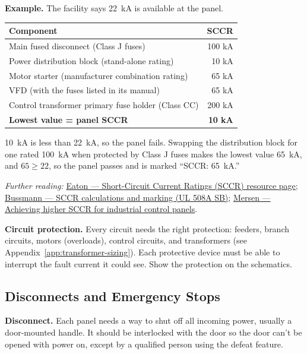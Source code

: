 \textbf{Example.} The facility says 22~kA is available at the panel.
\begin{center}
\small
\begin{tabular}{@{}lr@{}}
\toprule
Component & SCCR \\ \midrule
Main fused disconnect (Class J fuses) & 100 kA \\
Power distribution block (stand-alone rating) & 10 kA \\
Motor starter (manufacturer combination rating) & 65 kA \\
VFD (with the fuses listed in its manual) & 65 kA \\
Control transformer primary fuse holder (Class CC) & 200 kA \\ \midrule
\textbf{Lowest value = panel SCCR} & \textbf{10 kA} \\
\bottomrule
\end{tabular}
\end{center}
10~kA is less than 22~kA, so the panel fails. Swapping the distribution block for one rated 100~kA when protected by Class J fuses makes the lowest value 65~kA, and $65 \geq 22$, so the panel passes and is marked ``SCCR: 65~kA.''

\textit{Further reading:} \href{https://www.eaton.com/us/en-us/products/electrical-circuit-protection/short-circuit-current-ratings.html}{Eaton --- Short-Circuit Current Ratings (SCCR) resource page}; \href{https://www.eaton.com/content/dam/eaton/products/electrical-circuit-protection/fuses/solution-center/bus-ele-tech-lib-short-circuit-current-rating-calculations-and-marking-2008-spd.pdf}{Bussmann --- SCCR calculations and marking (UL 508A SB)}; \href{https://www.mersen.com/sites/default/files/files_imported_ep/TT-SCN1-Achieving-Higher-Short-Circuit-Current-Ratings-for-Industrial-Control-Panels-Tech-Topic.pdf}{Mersen --- Achieving higher SCCR for industrial control panels}.

\textbf{Circuit protection.} Every circuit needs the right protection: feeders, branch circuits, motors (overloads), control circuits, and transformers (see Appendix~\ref{app:transformer-sizing}). Each protective device must be able to interrupt the fault current it could see. Show the protection on the schematics.

\subsection{Disconnects and Emergency Stops}
\textbf{Disconnect.} Each panel needs a way to shut off all incoming power, usually a door-mounted handle. It should be interlocked with the door so the door can't be opened with power on, except by a qualified person using the defeat feature.

